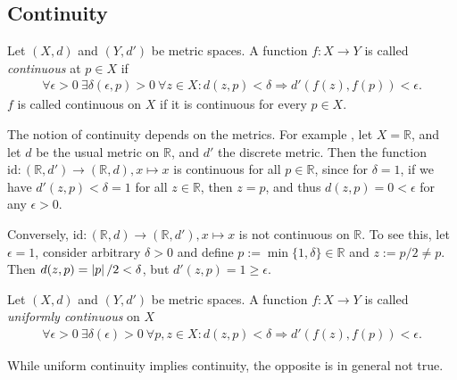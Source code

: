 \newpage 
\subsection{Continuity}
\begin{defn}\label{defn:continuity}
	Let $(X, d)$ and $(Y, d')$ be metric spaces. A function $f: X\rightarrow Y$ is called \textit{continuous} at $p\in X$ if 
	\begin{align}
		\forall \epsilon > 0\ \exists \delta(\epsilon, p) > 0\ \forall z\in X: d\left(z, p\right) < \delta \Rightarrow d'\left( f\left(z\right), f\left(p\right) \right) < \epsilon.  
	\end{align}
	$f$ is called continuous on $X$ if it is continuous for every $p\in X$.
\end{defn}

\begin{remark}
	The notion of continuity depends on the metrics. For example \cite{2087322}, let $X = \mathbb R$, and let $d$ be the usual metric on $\mathbb R$, and $d'$ the discrete metric. Then the function $\text{id}: (\mathbb R, d') \to (\mathbb R, d), x\mapsto x$ is continuous for all $p\in \mathbb R$, since for $\delta = 1$, if we have $d'(z, p) < \delta = 1$ for all $z\in\mathbb R$, then $z = p$, and thus $d(z, p) = 0 < \epsilon$ for any $\epsilon > 0$.
	
	Conversely, $\text{id}: (\mathbb R, d) \to (\mathbb R, d'), x\mapsto x$ is not continuous on $\mathbb R$. To see this, let $\epsilon = 1$, consider arbitrary $\delta > 0$ and define $p := \min\{1, \delta\}\in\mathbb R$ and $z := p/2\ne p$. Then $d(z, p) = \left\vert p \right\vert/2 < \delta$, but $d'(z, p) = 1 \geq \epsilon$.
\end{remark}

\begin{defn}
	Let $(X, d)$ and $(Y, d')$ be metric spaces. A function $f: X\rightarrow Y$ is called \textit{uniformly continuous} on $X$
	\begin{align}
		\forall\epsilon > 0\ \exists \delta(\epsilon) > 0\ \forall p, z\in X: d\left(z, p\right) < \delta \Rightarrow d'\left( f\left(z\right), f\left(p\right) \right) < \epsilon.
	\end{align}
\end{defn}

\begin{remark}
	While uniform continuity implies continuity, the opposite is in general not true.
\end{remark}

